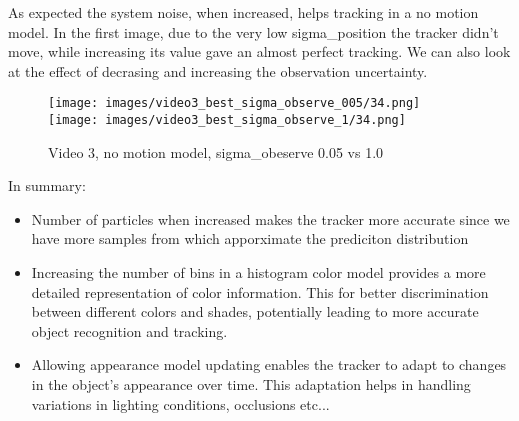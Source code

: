 \documentclass{ETHExercise}
\begin{document}
As expected the system noise, when increased, helps tracking in a no motion model. In the first 
image, due to the very low sigma\_position the tracker didn't move, while increasing its value 
gave an almost perfect tracking.
\newpage
We can also look at the effect of decrasing and increasing the observation uncertainty.

\begin{figure}[!h]
    \texttt{[image: images/video3\_best\_sigma\_observe\_005/34.png]}
  \endminipage
    \texttt{[image: images/video3\_best\_sigma\_observe\_1/34.png]}
  \endminipage
  \caption{Video 3, no motion model, sigma\_obeserve 0.05 vs 1.0}
\end{figure}

In summary:
\begin{itemize}
  \item Number of particles when increased makes the tracker more accurate
  since we have more samples from which apporximate the prediciton distribution
  \item Increasing the number of bins in a histogram color model provides a more detailed 
  representation of color information. This for better discrimination 
  between different colors and shades, potentially leading to more accurate 
  object recognition and tracking.
  \item Allowing appearance model updating enables the tracker to adapt to 
  changes in the object's appearance over time. This adaptation helps in 
  handling variations in lighting conditions, occlusions etc...
\end{itemize}
\end{document}
